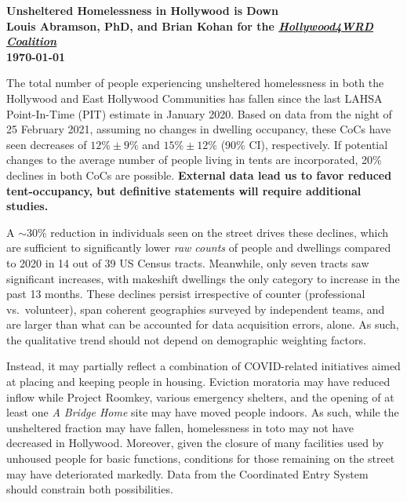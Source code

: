 \documentclass[11pt]{article}
\def\bfr{\bf\color{red}}
\def\resp{respectively}
\begin{document}

\begin{center}
	\Large\bf Unsheltered Homelessness in Hollywood is Down\\
	\vspace{1ex}
	{\normalsize\rm Louis Abramson, PhD, and Brian Kohan 
	for the \href{http://www.hollywood4wrd.live}{\it Hollywood4WRD Coalition} \\ \today}


\end{center}

 The total number of people experiencing unsheltered homelessness in both the 
Hollywood and East Hollywood Communities has fallen since the last LAHSA Point-In-Time (PIT) 
estimate in January 2020. Based on data from the night of 25 February 2021, assuming no changes in
dwelling occupancy, these CoCs have seen decreases of $12\%\pm9\%$ and $15\%\pm12\%$ (90\% CI), \resp. If 
potential changes to the average number of people living in tents are incorporated, 20\% declines in both 
CoCs are possible. {\bfr External data lead us to favor reduced tent-occupancy, but definitive statements will 
require additional studies.} 

A $\sim$30\% reduction in individuals seen on the street drives these declines, which are sufficient to 
significantly lower {\it raw counts} of people and dwellings compared to 2020 in 14 out of 39 US Census tracts. 
Meanwhile, only seven tracts saw significant increases, with makeshift dwellings the only category to increase in the 
past 13 months. These declines persist irrespective of counter (professional vs.\ volunteer), span coherent geographies 
surveyed by independent teams, and are larger than what can be accounted for data acquisition errors, alone. 
As such, the qualitative trend should not depend on demographic weighting factors. 

Instead, it may partially reflect a combination of COVID-related initiatives aimed at placing and keeping people in 
housing. Eviction moratoria may have reduced inflow while Project Roomkey, various emergency shelters, and the 
opening of at least one {\it A Bridge Home} site may have moved people indoors. As such, while the unsheltered 
fraction may have fallen, homelessness in toto may not have decreased in Hollywood. Moreover, given the closure
of many facilities used by unhoused people for basic functions, conditions for those remaining on the street may
have deteriorated markedly. Data from the Coordinated Entry System should constrain both possibilities.
\end{document}
